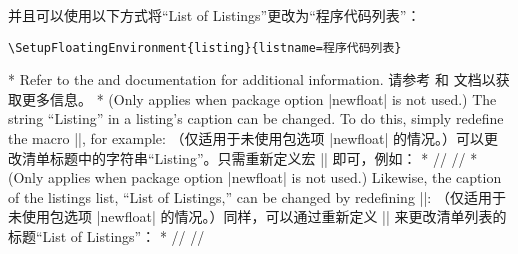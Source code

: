 \begin{paracol}{2}
\switchcolumn
并且可以使用以下方式将“List of Listings”更改为“程序代码列表”：
\begin{verbatim}
\SetupFloatingEnvironment{listing}{listname=程序代码列表}
\end{verbatim}
\switchcolumn[0]*%
Refer to the  and  documentation for additional information.
\switchcolumn
请参考  和  文档以获取更多信息。
\switchcolumn[0]*%
\DescribeMacro{\listingscaption}
(Only applies when package option |newfloat| is not used.) The string ``Listing'' in a listing's caption can be changed.
To do this, simply redefine the macro |\listingscaption|, for example:
\switchcolumn
\DescribeMacro{\listingscaption}
（仅适用于未使用包选项 |newfloat| 的情况。）可以更改清单标题中的字符串“Listing”。只需重新定义宏 |\listingscaption| 即可，例如：
\switchcolumn[0]*%
/\renewcommand{\listingscaption}{Program code}/
\switchcolumn
{}/\renewcommand{\listingscaption}{程序代码}/
\switchcolumn[0]*%
\DescribeMacro{\listoflistingscaption}
(Only applies when package option |newfloat| is not used.) Likewise, the caption of the listings list, ``List of Listings,'' can be changed by redefining
|\listoflistingscaption|:
\switchcolumn
\DescribeMacro{\listoflistingscaption}
（仅适用于未使用包选项 |newfloat| 的情况。）同样，可以通过重新定义 |\listoflistingscaption| 来更改清单列表的标题“List of Listings”：
\switchcolumn[0]*%
/\renewcommand{\listoflistingscaption}{List of Program Code}/
\switchcolumn
{}/\renewcommand{\listoflistingscaption}{程序代码列表}/
\end{paracol}